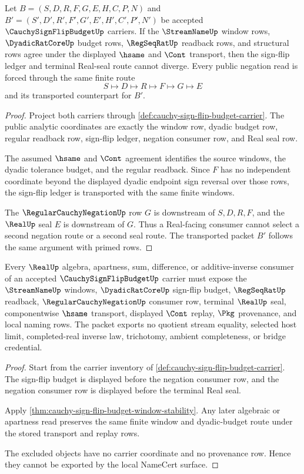 \begin{theorem}
\label{thm:cauchy-sign-flip-budget-window-stability}
Let $B=(S,D,R,F,G,E,H,C,P,N)$ and $B'=(S',D',R',F',G',E',H',C',P',N')$ be accepted $\CauchySignFlipBudgetUp$ carriers. If the $\StreamNameUp$ window rows, $\DyadicRatCoreUp$ budget rows, $\RegSeqRatUp$ readback rows, and structural rows agree under the displayed $\hsame$ and $\Cont$ transport, then the sign-flip ledger and terminal Real-seal route cannot diverge. Every public negation read is forced through the same finite route
$$
S\longmapsto D\longmapsto R\longmapsto F\longmapsto G\longmapsto E
$$
and its transported counterpart for $B'$.
\end{theorem}
\begin{proof}
Project both carriers through \autoref{def:cauchy-sign-flip-budget-carrier}. The public analytic coordinates are exactly the window row, dyadic budget row, regular readback row, sign-flip ledger, negation consumer row, and Real seal row.

The assumed $\hsame$ and $\Cont$ agreement identifies the source windows, the dyadic tolerance budget, and the regular readback. Since $F$ has no independent coordinate beyond the displayed dyadic endpoint sign reversal over those rows, the sign-flip ledger is transported with the same finite windows.

The $\RegularCauchyNegationUp$ row $G$ is downstream of $S,D,R,F$, and the $\RealUp$ seal $E$ is downstream of $G$. Thus a Real-facing consumer cannot select a second negation route or a second seal route. The transported packet $B'$ follows the same argument with primed rows.
\end{proof}

\begin{theorem}
\label{thm:cauchy-sign-flip-budget-real-seal-boundary}
Every $\RealUp$ algebra, apartness, sum, difference, or additive-inverse consumer of an accepted $\CauchySignFlipBudgetUp$ carrier must expose the $\StreamNameUp$ windows, $\DyadicRatCoreUp$ sign-flip budget, $\RegSeqRatUp$ readback, $\RegularCauchyNegationUp$ consumer row, terminal $\RealUp$ seal, componentwise $\hsame$ transport, displayed $\Cont$ replay, $\Pkg$ provenance, and local naming rows. The packet exports no quotient stream equality, selected host limit, completed-real inverse law, trichotomy, ambient completeness, or bridge credential.
\end{theorem}
\begin{proof}
Start from the carrier inventory of \autoref{def:cauchy-sign-flip-budget-carrier}. The sign-flip budget is displayed before the negation consumer row, and the negation consumer row is displayed before the terminal Real seal.

Apply \autoref{thm:cauchy-sign-flip-budget-window-stability}. Any later algebraic or apartness read preserves the same finite window and dyadic-budget route under the stored transport and replay rows.

The excluded objects have no carrier coordinate and no provenance row. Hence they cannot be exported by the local NameCert surface.
\end{proof}

